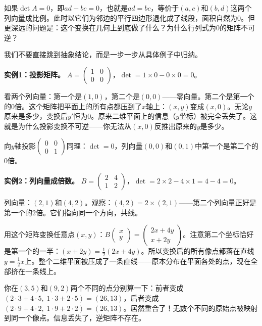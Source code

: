 
如果$\det A=0$，即$ad-bc=0$，也就是$ad=bc$，等价于$(a,c)$和$(b,d)$这两个列向量成比例。此时以它们为邻边的平行四边形退化成了线段，面积自然为$0$。但更深远的问题是：这个变换在几何上到底做了什么？为什么行列式为$0$的矩阵不可逆？

我们不要直接跳到抽象结论，而是一步一步从具体例子中归纳。

\vspace{0.2cm}
\noindent\textbf{实例1：投影矩阵。}
$A=\begin{pmatrix}1&0\\0&0\end{pmatrix}$，$\det=1\times0-0\times0=0$。

看两个列向量：第一个是$(1,0)$，第二个是$(0,0)$——零向量。第二个是第一个的$0$倍。这个矩阵把平面上的所有点都压到了$x$轴上：$(x,y)$变成$(x,0)$。无论$y$原来是多少，变换后$y'$恒为$0$。原来二维平面上的信息（$y$坐标）被完全丢失了。这就是为什么投影变换不可逆——你无法从$(x,0)$反推出原来的$y$是多少。

向$y$轴投影$\begin{pmatrix}0&0\\0&1\end{pmatrix}$同理：$\det=0$，列向量$(0,0)$和$(0,1)$中第一个是第二个的$0$倍。

\vspace{0.2cm}
\noindent\textbf{实例2：列向量成倍数。}
$B=\begin{pmatrix}2&4\\1&2\end{pmatrix}$，$\det=2\times2-4\times1=4-4=0$。

列向量：$(2,1)$和$(4,2)$。观察：$(4,2)=2\times(2,1)$——第二个列向量正好是第一个的$2$倍。它们指向同一个方向，共线。

用这个矩阵变换任意点$(x,y)$：$B\begin{pmatrix}x\\y\end{pmatrix}=\begin{pmatrix}2x+4y\\x+2y\end{pmatrix}$。注意第二个坐标恰好是第一个的一半：$(x+2y)=\frac12(2x+4y)$。所以变换后的所有像点都落在直线$y=\frac12 x$上。整个二维平面被压成了一条直线——原本分布在平面各处的点，现在全部挤在一条线上。

你在$(3,5)$和$(9,2)$两个不同的点分别算一下：前者变成$(2\cdot3+4\cdot5,\;1\cdot3+2\cdot5)=(26,13)$，后者变成$(2\cdot9+4\cdot2,\;1\cdot9+2\cdot2)=(26,13)$。居然重合了！无数个不同的原始点被映射到同一个像点。信息丢失了，逆矩阵不存在。

